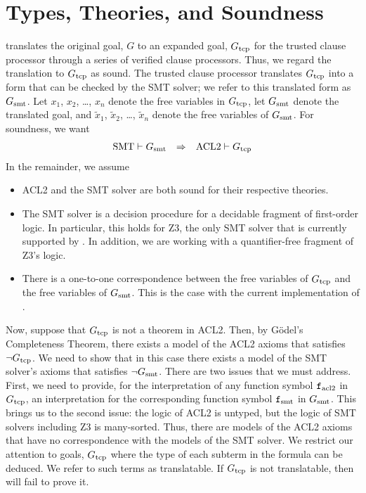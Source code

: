 \section{Types, Theories, and Soundness}\label{sec:theories}
\smtlink{} translates the original goal, $G$ to an expanded goal, $G_{\mathrm{tcp}}$
for the trusted clause processor through a series of verified clause processors.
Thus, we regard the translation to $G_{\mathrm{tcp}}$ as sound.
The trusted clause processor translates $G_{\mathrm{tcp}}$ into a form that can be checked
by the SMT solver; we refer to this translated form as $G_{\mathrm{smt}}$.
Let $x_1$, $x_2$, \ldots, $x_n$ denote the free variables in $G_{\mathrm{tcp}}$,
let $G_{\mathrm{smt}}$ denote the translated goal,
and $\tilde{x}_1$, $\tilde{x}_2$, \ldots, $\tilde{x}_n$ denote
the free variables of $G_{\mathrm{smt}}$.
For soundness, we want
\begin{equation}\label{eq:soundness}\begin{array}{rcl}
  \mathrm{SMT} \vdash G_{\mathrm{smt}} &\Rightarrow& \mathrm{ACL2} \vdash G_{\mathrm{tcp}}
\end{array}\end{equation}
In the remainder, we assume
\begin{itemize}
  \item ACL2 and the SMT solver are both sound for their respective theories.
  \item The SMT solver is a decision procedure for a decidable fragment of first-order logic.
    In particular, this holds for Z3, the only SMT solver that is currently
    supported by \smtlink{}. In addition, we are working with a quantifier-free
    fragment of Z3's logic.
  \item There is a one-to-one correspondence between the free variables of $G_{\mathrm{tcp}}$
    and the free variables of $G_{\mathrm{smt}}$.
    This is the case with the current implementation of \smtlink{}.
\end{itemize}

Now, suppose that $G_{\mathrm{tcp}}$ is not a theorem in ACL2.  Then, by G\"{o}del's
Completeness Theorem, there exists a model of the ACL2 axioms that satisfies
$\neg G_{\mathrm{tcp}}$. We need to show that in this case there exists a model of the SMT
solver's axioms that satisfies $\neg G_{\mathrm{smt}}$.  There are two issues that we must
address. First, we need to provide, for the interpretation of any function
symbol $\mathtt{f}_{\mathrm{acl2}}$ in $G_{\mathrm{tcp}}$, an interpretation for the corresponding function
symbol $\mathtt{f}_{\mathrm{smt}}$ in $G_{\mathrm{smt}}$.
This brings us to the second issue: the logic of ACL2 is untyped, but the logic
of SMT solvers including Z3 is many-sorted.
Thus, there are models of the ACL2 axioms that have no correspondence with the
models of the SMT solver.
We restrict our attention to goals, $G_{\mathrm{tcp}}$ where the type of each subterm in the
formula can be deduced.  We refer to such terms as translatable.  If $G_{\mathrm{tcp}}$ is
not translatable, then \smtlink{} will fail to prove it.

